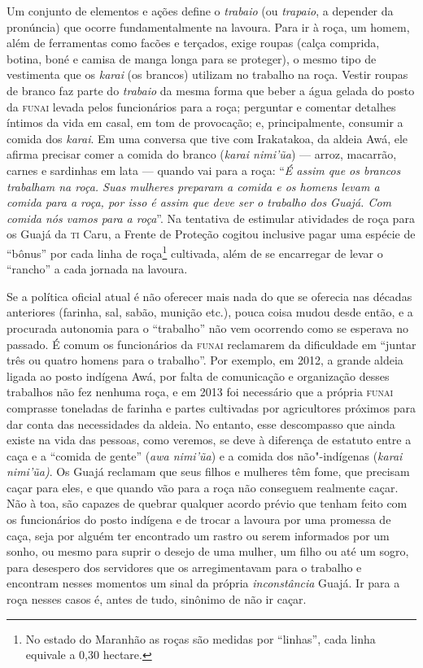Um conjunto de elementos e ações define o \emph{trabaio} (ou
\emph{trapaio}, a depender da pronúncia) que ocorre fundamentalmente na
lavoura. Para ir à roça, um homem, além de ferramentas como facões e
terçados, exige roupas (calça comprida, botina, boné e camisa de manga
longa para se proteger), o mesmo tipo de vestimenta que os \emph{karai}
(os brancos) utilizam no trabalho na roça. Vestir roupas de branco faz
parte do \emph{trabaio} da mesma forma que beber a água gelada do posto
da \textsc{funai} levada pelos funcionários para a roça; perguntar e comentar
detalhes íntimos da vida em casal, em tom de provocação; e,
principalmente, consumir a comida dos \emph{karai}. Em uma conversa que
tive com Irakatakoa, da aldeia Awá, ele afirma precisar comer a
comida do branco (\emph{karai nimi'ũa}) --- arroz, macarrão, carnes e
sardinhas em lata --- quando vai para a roça: ``\emph{É assim que os
brancos trabalham na roça. Suas mulheres preparam a comida e os homens
levam a comida para a roça, por isso é assim que deve ser o trabalho dos
Guajá. Com comida nós vamos para a roça}''. Na tentativa de estimular
atividades de roça para os Guajá da \textsc{ti} Caru, a Frente de Proteção
cogitou inclusive pagar uma espécie de ``bônus'' por cada linha de
roça\footnote{No estado do Maranhão as roças são medidas por ``linhas'',
  cada linha equivale a 0,30 hectare.} cultivada, além de se encarregar
de levar o ``rancho'' a cada jornada na lavoura.

Se a política oficial atual é não oferecer mais nada do que se oferecia
nas décadas anteriores (farinha, sal, sabão, munição etc.), pouca coisa
mudou desde então, e a procurada autonomia para o ``trabalho'' não vem
ocorrendo como se esperava no passado. É comum os funcionários da \textsc{funai}
reclamarem da dificuldade em ``juntar três ou quatro homens para o
trabalho''. Por exemplo, em 2012, a grande aldeia ligada ao posto
indígena Awá, por falta de comunicação e organização desses
trabalhos não fez nenhuma roça, e em 2013 foi necessário que a própria
\textsc{funai} comprasse toneladas de farinha e partes cultivadas por
agricultores próximos para dar conta das necessidades da aldeia. No
entanto, esse descompasso que ainda existe na vida das pessoas, como
veremos, se deve à diferença de estatuto entre a caça e a ``comida de
gente'' (\emph{awa nimi'ũa}) e a comida dos não"-indígenas (\emph{karai
nimi'ũa)}. Os Guajá reclamam que seus filhos e mulheres têm fome, que
precisam caçar para eles, e que quando vão para a roça não conseguem
realmente caçar. Não à toa, são capazes de quebrar qualquer acordo
prévio que tenham feito com os funcionários do posto indígena e de
trocar a lavoura por uma promessa de caça, seja por alguém ter
encontrado um rastro ou serem informados por um sonho, ou mesmo para
suprir o desejo de uma mulher, um filho ou até um sogro, para desespero
dos servidores que os arregimentavam para o trabalho e encontram nesses
momentos um sinal da própria \emph{inconstância} Guajá. Ir para a roça
nesses casos é, antes de tudo, sinônimo de não ir caçar.

